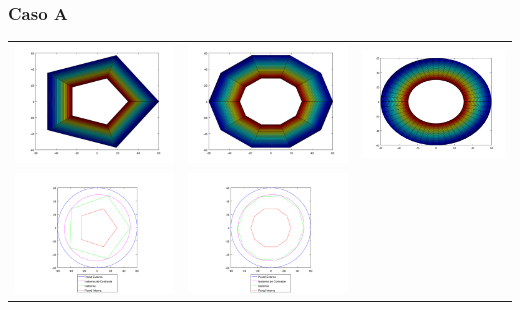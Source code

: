         \subsubsection*{Caso A}
            {\centering \begin{tabular}{ccc}
              \includegraphics[width=4.5cm]{graficos/exp4/seno/exp4-seno-ang-5.png} &
              \includegraphics[width=4.5cm]{graficos/exp4/seno/exp4-seno-ang-10.png} &
              \includegraphics[width=4.5cm]{graficos/exp4/seno/exp4-seno-ang-50.png} \\
              \includegraphics[width=5cm]{graficos/exp4/seno/exp4-seno-ang-5-iso.png} &
              \includegraphics[width=5cm]{graficos/exp4/seno/exp4-seno-ang-10-iso.png} &

\end{tabular}}
